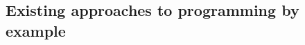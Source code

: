\documentclass{article} %
\begin{document}
\subsection{Existing approaches to programming by example} \label{sec:pbe}





\end{document}
